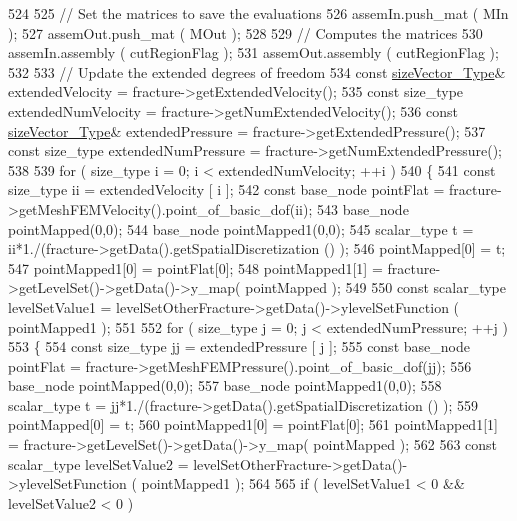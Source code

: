 \begin{DoxyCode}
524 
525     \textcolor{comment}{// Set the matrices to save the evaluations}
526     assemIn.push\_mat ( MIn );
527     assemOut.push\_mat ( MOut );
528 
529     \textcolor{comment}{// Computes the matrices}
530     assemIn.assembly ( cutRegionFlag );
531     assemOut.assembly ( cutRegionFlag );
532 
533     \textcolor{comment}{// Update the extended degrees of freedom}
534     \textcolor{keyword}{const} \hyperlink{Core_8h_a83c51913d041a5001e8683434c09857f}{sizeVector\_Type}& extendedVelocity = fracture->getExtendedVelocity();
535     \textcolor{keyword}{const} size\_type extendedNumVelocity = fracture->getNumExtendedVelocity();
536     \textcolor{keyword}{const} \hyperlink{Core_8h_a83c51913d041a5001e8683434c09857f}{sizeVector\_Type}& extendedPressure = fracture->getExtendedPressure();
537     \textcolor{keyword}{const} size\_type extendedNumPressure = fracture->getNumExtendedPressure();
538 
539     \textcolor{keywordflow}{for} ( size\_type i = 0; i < extendedNumVelocity; ++i )
540     \{
541         \textcolor{keyword}{const} size\_type ii = extendedVelocity [ i ];
542         \textcolor{keyword}{const} base\_node pointFlat = fracture->getMeshFEMVelocity().point\_of\_basic\_dof(ii);
543         base\_node pointMapped(0,0);
544         base\_node pointMapped1(0,0);
545     scalar\_type t = ii*1./(fracture->getData().getSpatialDiscretization () );
546         pointMapped[0] = t;
547         pointMapped1[0] = pointFlat[0];
548         pointMapped1[1] = fracture->getLevelSet()->getData()->y\_map( pointMapped );
549 
550         \textcolor{keyword}{const} scalar\_type levelSetValue1 = levelSetOtherFracture->getData()->ylevelSetFunction ( 
      pointMapped1 );
551 
552         \textcolor{keywordflow}{for} ( size\_type j = 0; j < extendedNumPressure; ++j )
553         \{
554             \textcolor{keyword}{const} size\_type jj = extendedPressure [ j ];
555             \textcolor{keyword}{const} base\_node pointFlat = fracture->getMeshFEMPressure().point\_of\_basic\_dof(jj);
556             base\_node pointMapped(0,0);
557             base\_node pointMapped1(0,0);
558             scalar\_type t = jj*1./(fracture->getData().getSpatialDiscretization () );
559             pointMapped[0] = t;
560             pointMapped1[0] = pointFlat[0];
561             pointMapped1[1] = fracture->getLevelSet()->getData()->y\_map( pointMapped );
562            
563         \textcolor{keyword}{const} scalar\_type levelSetValue2 = levelSetOtherFracture->getData()->ylevelSetFunction ( 
      pointMapped1 );
564 
565             \textcolor{keywordflow}{if} ( levelSetValue1 < 0 && levelSetValue2 < 0 )

\end{DoxyCode}
